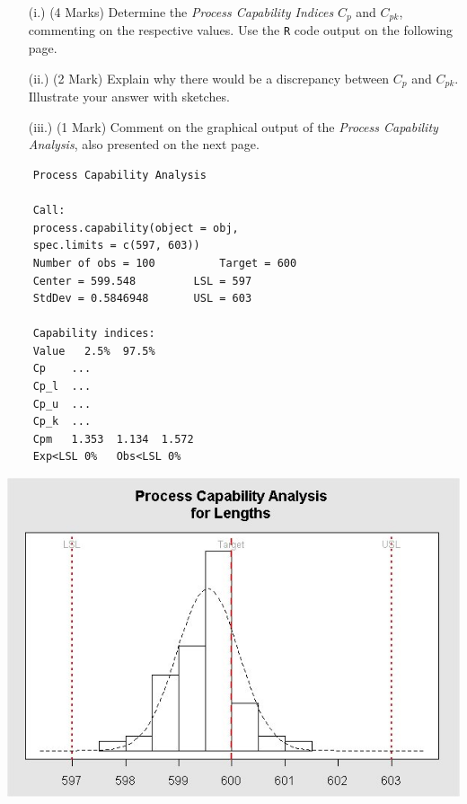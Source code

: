 \documentclass[a4paper,12pt]{article}
\begin{document}
\begin{itemize}
	\item[(i.)] (4 Marks) Determine the \emph{Process Capability Indices} $C_p$ and $C_{pk}$, commenting on the respective values. Use the \texttt{R} code output on the following page.
	\item[(ii.)] (2 Mark)  Explain why there would be a discrepancy between $C_p$ and $C_{pk}$. Illustrate your answer with sketches.
	\item[(iii.)] (1 Mark) Comment on the graphical output of the \emph{Process Capability Analysis}, also presented on the next page.
\end{itemize}



\newpage
\begin{framed}
	\begin{verbatim}
	Process Capability Analysis
	
	Call:
	process.capability(object = obj,  
	spec.limits = c(597, 603))
	Number of obs = 100          Target = 600
	Center = 599.548         LSL = 597
	StdDev = 0.5846948       USL = 603
	
	Capability indices:
	Value   2.5%  97.5%
	Cp    ...
	Cp_l  ...
	Cp_u  ...
	Cp_k  ...
	Cpm   1.353  1.134  1.572
	Exp<LSL 0%   Obs<LSL 0%
	\end{verbatim}
\end{framed}



\begin{center}
	\includegraphics[scale=0.55]{images/ExamQ4hist}
\end{center}
\newpage
%
%
%
\end{document}
